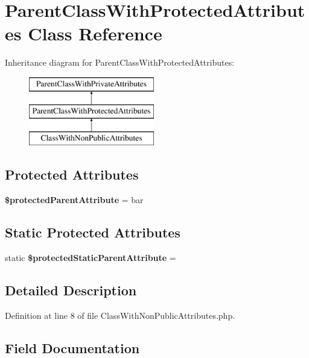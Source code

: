 \section{Parent\+Class\+With\+Protected\+Attributes Class Reference}
\label{class_parent_class_with_protected_attributes}
Inheritance diagram for Parent\+Class\+With\+Protected\+Attributes\+:\begin{figure}[H]
\begin{center}
\leavevmode
\includegraphics[height=3.000000cm]{class_parent_class_with_protected_attributes}
\end{center}
\end{figure}
\subsection*{Protected Attributes}
\begin{DoxyCompactItemize}
\item 
{\bf \$protected\+Parent\+Attribute} = \textquotesingle{}bar\textquotesingle{}
\end{DoxyCompactItemize}
\subsection*{Static Protected Attributes}
\begin{DoxyCompactItemize}
\item 
static {\bf \$protected\+Static\+Parent\+Attribute} = \textquotesingle{}
\end{DoxyCompactItemize}


\subsection{Detailed Description}


Definition at line 8 of file Class\+With\+Non\+Public\+Attributes.\+php.



\subsection{Field Documentation}
